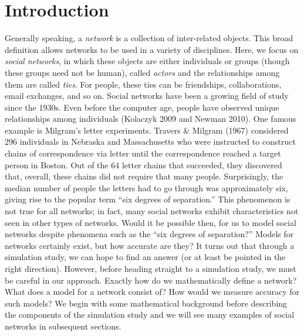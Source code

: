 \documentclass[12pt,twoside]{amherstthesis}
\begin{document}
  
  \mainmatter %
  \pagestyle{fancyplain} %

  \onehalfspacing
  
  \chapter*{Introduction}\label{introduction}
  
  Generally speaking, a \emph{network} is a collection of inter-related
  objects. This broad definition allows networks to be used in a variety
  of disciplines. Here, we focus on \emph{social networks}, in which these
  objects are either individuals or groups (though these groups need not
  be human), called \emph{actors} and the relationships among them are
  called \emph{ties}. For people, these ties can be friendships,
  collaborations, email exchanges, and so on. Social networks have been a
  growing field of study since the 1930s. Even before the computer age,
  people have observed unique relationships among individuals (Kolaczyk
  2009 and Newman 2010). One famous example is Milgram's letter
  experiments. Travers \& Milgram (1967) considered 296 individuals in
  Nebraska and Massachusetts who were instructed to construct chains of
  correspondence via letter until the correspondence reached a target
  person in Boston. Out of the 64 letter chains that succeeded, they
  discovered that, overall, these chains did not require that many people.
  Surprisingly, the median number of people the letters had to go through
  was approximately six, giving rise to the popular term ``six degrees of
  separation.'' This phenomenon is not true for all networks; in fact,
  many social networks exhibit characteristics not seen in other types of
  networks. Would it be possible then, for us to model social networks
  despite phenomena such as the ``six degrees of separation?'' Models for
  networks certainly exist, but how accurate are they? It turns out that
  through a simulation study, we can hope to find an answer (or at least
  be pointed in the right direction). However, before heading straight to
  a simulation study, we must be careful in our approach. Exactly how do
  we mathematically define a network? What does a model for a network
  consist of? How would we measure accuracy for such models? We begin with
  some mathematical background before describing the components of the
  simulation study and we will see many examples of social networks in
  subsequent sections.
  
\end{document}
